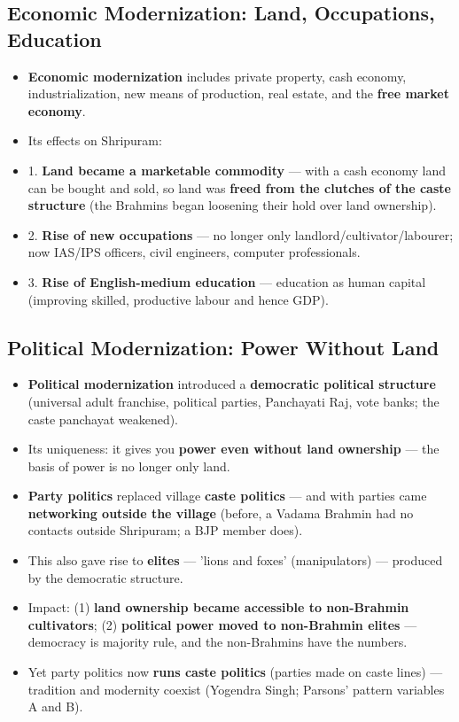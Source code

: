 \subsection{Economic Modernization: Land, Occupations, Education}

\begin{KeyConcept}
\begin{itemize}
\item \textbf{Economic modernization} includes private property, cash economy, industrialization, new means of production, real estate, and the \textbf{free market economy}.
\item Its effects on Shripuram:
\item 1. \textbf{Land became a marketable commodity} --- with a cash economy land can be bought and sold, so land was \textbf{freed from the clutches of the caste structure} (the Brahmins began loosening their hold over land ownership).
\item 2. \textbf{Rise of new occupations} --- no longer only landlord/cultivator/labourer; now IAS/IPS officers, civil engineers, computer professionals.
\item 3. \textbf{Rise of English-medium education} --- education as human capital (improving skilled, productive labour and hence GDP).
\end{itemize}
\end{KeyConcept}

\subsection{Political Modernization: Power Without Land}

\begin{KeyConcept}
\begin{itemize}
\item \textbf{Political modernization} introduced a \textbf{democratic political structure} (universal adult franchise, political parties, Panchayati Raj, vote banks; the caste panchayat weakened).
\item Its uniqueness: it gives you \textbf{power even without land ownership} --- the basis of power is no longer only land.
\item \textbf{Party politics} replaced village \textbf{caste politics} --- and with parties came \textbf{networking outside the village} (before, a Vadama Brahmin had no contacts outside Shripuram; a BJP member does).
\item This also gave rise to \textbf{elites} --- 'lions and foxes' (manipulators) --- produced by the democratic structure.
\item Impact: (1) \textbf{land ownership became accessible to non-Brahmin cultivators}; (2) \textbf{political power moved to non-Brahmin elites} --- democracy is majority rule, and the non-Brahmins have the numbers.
\item Yet party politics now \textbf{runs caste politics} (parties made on caste lines) --- tradition and modernity coexist (Yogendra Singh; Parsons' pattern variables A and B).
\end{itemize}
\end{KeyConcept}


